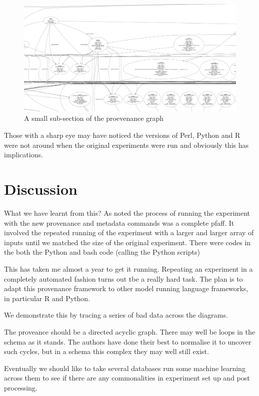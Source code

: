 \documentclass[runningheads]{llncs}
\begin{document}
\begin{figure}
\includegraphics[width=\textwidth]{img/subsection-of-provenance.png}
\caption{A small sub-section of the proevenance graph} \label{fig:sub-provenance}
\end{figure}

Those with a sharp eye may have noticed the versions of Perl, Python and R were not around when the original experiments were run and obviously this has implications.

\section{Discussion}

What we have learnt from this?  As noted the process of running the experiment with the new provenance and metadata commands was a complete pfaff. It involved the repeated running of the experiment with a larger and larger array of inputs until we matched the size of the original experiment.  There were codes in the both the Python and bash code (calling the Python scripts)


This has taken me almost a year to get it running. Repeating an experiment in a completely automated fashion turns out tbe a really hard task. The plan is to adapt this provenance framework to other model running language frameworks, in particular R and Python.


We demonstrate this by tracing a series of bad data across the diagrams.

The proveance should be a directed acyclic graph. There may well be loops in the schema as it stands. The authors have done their best to normalise it to uncover such cycles, but in a schema this complex they may well still exist.


Eventually we should like to take several databases run some machine learning across them to see if there are any commonalities in experiment set up and post processing.
\end{document}
